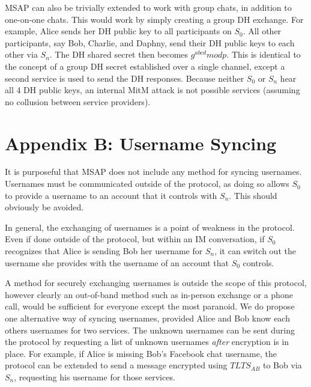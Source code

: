 \documentclass[twoside,10pt]{article}
\begin{document}
\begin{multicols}{2}
MSAP can also be trivially extended to work with group chats, in addition to one-on-one chats.  This would work by simply creating a group DH exchange.  For example, Alice sends her DH public key to all participants on $S_0$.  All other participants, say Bob, Charlie, and Daphny, send their DH public keys to each other via $S_n$.  The DH shared secret then becomes $g^{abcd} mod p$.  This is identical to the concept of a group DH secret established over a single channel, except a second service is used to send the DH responses.  Because neither $S_0$ or $S_n$ hear all 4 DH public keys, an internal MitM attack is not possible services (assuming no collusion between service providers).

\section{Appendix B: Username Syncing}
It is purposeful that MSAP does not include any method for syncing usernames.  Usernames must be communicated outside of the protocol, as doing so allows $S_0$ to provide a username to an account that it controls with $S_n$.  This should obviously be avoided.

In general, the exchanging of usernames is a point of weakness in the protocol.  Even if done outside of the protocol, but within an IM conversation, if $S_0$ recognizes that Alice is sending Bob her username for $S_n$, it can switch out the username she provides with the username of an account that $S_0$ controls.

A method for securely exchanging usernames is outside the scope of this protocol, however clearly an out-of-band method such as in-person exchange or a phone call, would be sufficient for everyone except the most paranoid.  We do propose one alternative way of syncing usernames, provided Alice and Bob know each others usernames for two services.  The unknown usernames can be sent during the protocol by requesting a list of unknown usernames \emph{after} encryption is in place.  For example, if Alice is missing Bob's Facebook chat username, the protocol can be extended to send a message encrypted using $TLTS_{AB}$ to Bob via $S_n$, requesting his username for those services.




\end{multicols}
\end{document}
